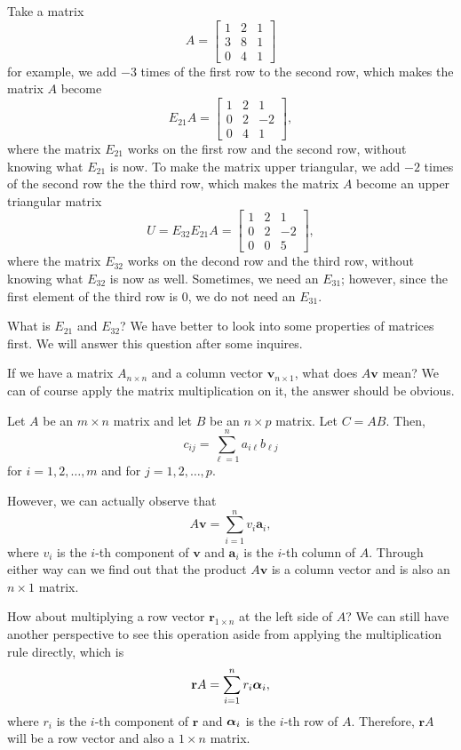 \documentclass[11pt]{article}
\theoremstyle{break}
\theoremstyle{no_label}
\newcommand{\bfa}{\textbf{a}}
\newcommand{\bfr}{\textbf{r}}
\newcommand{\bfv}{\textbf{v}}
\newcommand{\bfalpha}{\text{\boldmath$\alpha$}}
\numberwithin{equation}{section}
\begin{document}
Take a matrix $$A=\begin{bmatrix}
    1 & 2 & 1 \\
    3 & 8 & 1 \\
    0 & 4 & 1
\end{bmatrix}$$ for example, we add $-3$ times of the first row to the second row, which makes the matrix $A$ become $$E_{21}A=\begin{bmatrix}
    1 & 2 & 1 \\
    0 & 2 & -2 \\
    0 & 4 & 1
\end{bmatrix},$$ where the matrix $E_{21}$ works on the first row and the second row, without knowing what $E_{21}$ is now. To make the matrix upper triangular, we add $-2$ times of the second row the the third row, which makes the matrix $A$ become an upper triangular matrix $$U=E_{32}E_{21}A=\begin{bmatrix}
    1 & 2 & 1 \\
    0 & 2 & -2 \\
    0 & 0 & 5
\end{bmatrix},$$ where the matrix $E_{32}$ works on the decond row and the third row, without knowing what $E_{32}$ is now as well. Sometimes, we need an $E_{31}$; however, since the first element of the third row is $0$, we do not need an $E_{31}$.

What is $E_{21}$ and $E_{32}$? We have better to look into some properties of matrices first. We will answer this question after some inquires.

If we have a matrix $A_{n\times n}$ and a column vector $\bfv_{n\times 1}$, what does $A\bfv$ mean? We can of course apply the matrix multiplication on it, the answer should be obvious.

\begin{definition}
    Let $A$ be an $m\times n$ matrix and let $B$ be an $n\times p$ matrix. Let $C=AB$. Then, $$c_{ij}=\sum_{\ell=1}^{n}a_{i\ell}b_{\ell j}$$ for $i=1,2,\dots,m$ and for $j=1,2,\dots,p$.
\end{definition}

However, we can actually observe that $$A\bfv=\sum_{i=1}^{n} v_i\bfa_i,$$ where $v_i$ is the $i$-th component of $\bfv$ and $\bfa_i$ is the $i$-th column of $A$. Through either way can we find out that the product $A\bfv$ is a column vector and is also an $n\times 1$ matrix.

How about multiplying a row vector $\bfr_{1\times n}$ at the left side of $A$? We can still have another perspective to see this operation aside from applying the multiplication rule directly, which is $$\bfr A=\sum_{i=1}^{n}r_i\bfalpha_i,$$ where $r_i$ is the $i$-th component of $\bfr$ and $\bfalpha_i$ is the $i$-th row of $A$. Therefore, $\bfr A$ will be a row vector and also a $1\times n$ matrix.
\end{document}
